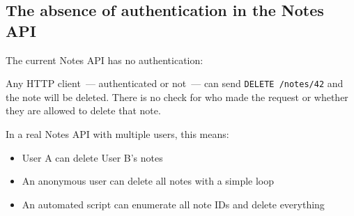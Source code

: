 \subsection*{The absence of authentication in the Notes API}\label{11-reliability-security-gaps:the-absence-of-authentication-in-the-notes-api}

The current Notes API has no authentication:

\begin{codebox}[short]

\begin{Shaded}
\begin{Highlighting}[]
\NormalTok{(}\OperatorTok{=}\NormalTok{[}\NormalTok{])}
\OperatorTok{=}
\OperatorTok{=}
    \OperatorTok{==} \NormalTok{:}
        \NormalTok{: }\SpecialCharTok{\{}\SpecialCharTok{\}}\NormalTok{\}), }
    \NormalTok{: }\SpecialCharTok{\{}\SpecialCharTok{\}}\NormalTok{\})}
\end{Highlighting}
\end{Shaded}

\end{codebox}

\noindent{}Any HTTP client~--- authenticated or not~--- can send \texttt{DELETE\ /notes/42} and the note will be deleted. There is no check for who made the request or whether they are allowed to delete that note.

In a real Notes API with multiple users, this means:

\begin{itemize}
\tightlist
\item
  User A can delete User B's notes
\item
  An anonymous user can delete all notes with a simple loop
\item
  An automated script can enumerate all note IDs and delete everything
\end{itemize}

